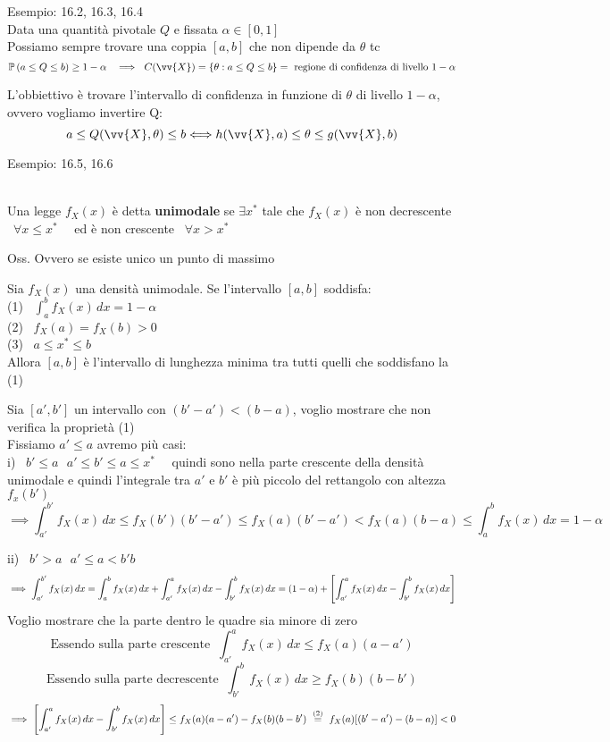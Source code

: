 Esempio: 16.2, 16.3, 16.4\\

Data una quantità pivotale $Q$ e fissata $\alpha \in [0,1]$\\
Possiamo sempre trovare una coppia  $[a,b]$ che non dipende da $\theta$ tc
\[
\prob{a\le Q\le b} \ge 1-\alpha \ \ \implies \ C(\vv{X})=\{\theta : a\le Q \le b \} = \text{ regione di confidenza di livello } 1-\alpha
\]

L'obbiettivo è trovare l'intervallo di confidenza in funzione di $\theta$ di livello $1-\alpha$, ovvero vogliamo invertire Q:
\[a\le Q(\vv{X},\theta)\le b \Longleftrightarrow h(\vv{X},a)\le \theta \le g(\vv{X},b)\]

Esempio: 16.5, 16.6\\ \\


\begin{defi}
    Una legge $f_X(x)$ è detta \textbf{unimodale} se $\exists x^*$ tale che $f_X(x)$ è non decrescente \ $\forall x\le x^*$ \ \ ed è non crescente \ $\forall x>x^*$
\end{defi}
Oss. Ovvero se esiste unico un punto di massimo \\

\begin{teo}
    Sia $f_X(x)$ una densità unimodale. Se l'intervallo $[a,b]$ soddisfa:\\
    (1) \ $\int_a^b f_X(x)\, dx = 1-\alpha$\\
    (2) \ $f_X(a)=f_X(b)>0$\\
    (3) \ $a \le x^* \le b $\\
    Allora $[a,b]$ è l'intervallo di lunghezza minima tra tutti quelli che soddisfano la (1)
\end{teo}


\begin{Dim}[*]
    Sia $[a',b']$ un intervallo con $(b'-a')<(b-a)$, voglio mostrare che non verifica la proprietà (1)\\
    Fissiamo $a'\le a$ avremo più casi:\\
    i) \ $b'\le a \ \ \ a'\le b'\le a\le x^*$ \ \ quindi sono nella parte crescente della densità unimodale e quindi l'integrale tra $a'$ e $b'$ è più piccolo del rettangolo con altezza $f_x(b')$
    \[
    \implies \int_{a'}^{b'}f_X(x)\, dx \le f_X(b')(b'-a') \le f_X(a)(b'-a') < f_X(a)(b-a) \le \int_{a}^{b}f_X(x)\, dx = 1-\alpha
    \]
    \phantom{}

    ii) \ $b'> a \ \ \ a'\le a < b' b$
    \[
    \implies \int_{a'}^{b'}f_X(x)\, dx = \int_{a}^{b}f_X(x)\, dx + \int_{a'}^{a}f_X(x)\, dx -\int_{b'}^{b}f_X(x)\, dx = (1-\alpha) + \OO \int_{a'}^{a}f_X(x)\, dx -\int_{b'}^{b}f_X(x)\, dx  \CC
    \]
    Voglio mostrare che la parte dentro le quadre sia minore di zero
    \[
    \text{Essendo sulla parte crescente } \ \int_{a'}^{a}f_X(x)\, dx \le f_X(a)(a-a')
    \]
    \[
    \text{Essendo sulla parte decrescente } \ \int_{b'}^{b}f_X(x)\, dx \ge f_X(b)(b-b')
    \]
    \[
    \implies \OO \int_{a'}^{a}f_X(x)\, dx -\int_{b'}^{b}f_X(x)\, dx  \CC \le f_X(a)(a-a') -f_X(b)(b-b') \ \overset{(2)}{=} \ f_X(a)[(b'-a') - (b-a)] <0
    \]
\end{Dim}

